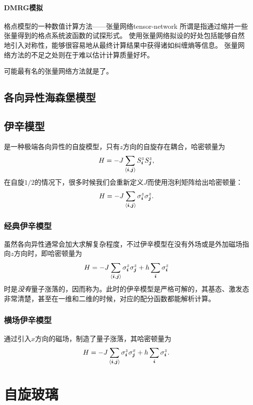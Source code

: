 \subsubsection{DMRG模拟}

\begin{back}{格点模型的一种数值计算方法——张量网络}{tensor-network}
    所谓是指通过缩并一些张量得到的格点系统波函数的试探形式。
    使用张量网络拟设的好处包括能够自然地引入对称性，能够很容易地从最终计算结果中获得诸如纠缠熵等信息。
    张量网络方法的不足之处则在于难以估计计算质量好坏。

    可能最有名的张量网络方法就是了。
\end{back}

\section{各向异性海森堡模型}


\section{伊辛模型}

是一种极端各向异性的自旋模型，只有$z$方向的自旋存在耦合，哈密顿量为
\begin{equation}
    H = - J \sum_{\langle \vb*{i}, \vb*{j} \rangle} S_{\vb*{i}}^z S_{\vb*{j}}^z ,
\end{equation}
在自旋$1/2$的情况下，很多时候我们会重新定义$J$而使用泡利矩阵给出哈密顿量：
\begin{equation}
    H = - J \sum_{\langle \vb*{i}, \vb*{j} \rangle} \sigma^z_{\vb*{i}} \sigma^z_{\vb*{j}}.
\end{equation}

\subsection{经典伊辛模型}

虽然各向异性通常会加大求解复杂程度，不过伊辛模型在没有外场或是外加磁场指向$z$方向时，即哈密顿量为
\begin{equation}
    H = - J \sum_{\langle \vb*{i}, \vb*{j} \rangle} \sigma^z_{\vb*{i}} \sigma^z_{\vb*{j}} + h \sum_{\vb*{i}} \sigma^z_{\vb*{i}}
\end{equation}
时是\emph{没有}量子涨落的，因而称为。此时的伊辛模型是严格可解的，其基态、激发态非常清楚，甚至在一维和二维的时候，对应的配分函数都能解析计算。

\subsection{横场伊辛模型}

通过引入$x$方向的磁场，制造了量子涨落，其哈密顿量为
\begin{equation}
    H = - J \sum_{\langle \vb*{i}, \vb*{j} \rangle} \sigma^z_{\vb*{i}} \sigma^x_{\vb*{j}} + h \sum_{\vb*{i}} \sigma^z_{\vb*{i}}.
\end{equation}

\chapter{自旋玻璃}
